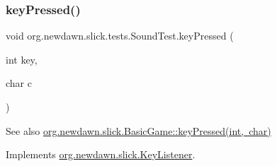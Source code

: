 \subsubsection{\texorpdfstring{key\+Pressed()}{keyPressed()}}
{\footnotesize\ttfamily void org.\+newdawn.\+slick.\+tests.\+Sound\+Test.\+key\+Pressed (\begin{DoxyParamCaption}\item[{int}]{key,  }\item[{char}]{c }\end{DoxyParamCaption})\hspace{0.3cm}{\ttfamily [inline]}}

\begin{DoxySeeAlso}{See also}
\mbox{\hyperlink{classorg_1_1newdawn_1_1slick_1_1_basic_game_a4fbb3345b5abf5ddd54a99466d07f02f}{org.\+newdawn.\+slick.\+Basic\+Game\+::key\+Pressed(int, char)}} 
\end{DoxySeeAlso}


Implements \mbox{\hyperlink{interfaceorg_1_1newdawn_1_1slick_1_1_key_listener_ac0b0568a21ef486c4f51382614c196ef}{org.\+newdawn.\+slick.\+Key\+Listener}}.


